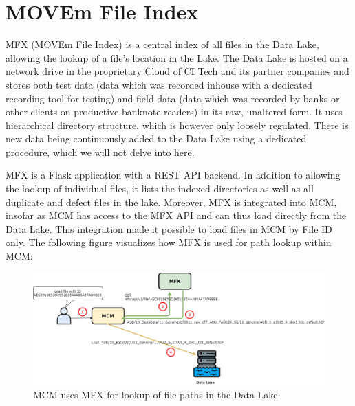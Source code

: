 \section{MOVEm File Index}
MFX (MOVEm File Index) is a central index of all files in the Data Lake, allowing the lookup of a file's location in the Lake. The Data Lake is hosted on a network drive in the proprietary Cloud of CI Tech and its partner companies and stores both test data (data which was recorded inhouse with a dedicated recording tool for testing) and field data (data which was recorded by banks or other clients on productive banknote readers) in its raw, unaltered form. It uses hierarchical directory structure, which is however only loosely regulated. There is new data being continuously added to the Data Lake using a dedicated procedure, which we will not delve into here.\par MFX is a Flask application with a REST API backend. In addition to allowing the lookup of individual files, it lists the indexed directories as well as all duplicate and defect files in the lake. Moreover, MFX is integrated into MCM, insofar as MCM has access to the MFX API and can thus load directly from the Data Lake. This integration made it possible to load files in MCM by File ID only.  The following figure visualizes how MFX is used for path lookup within MCM:
\begin{figure}[ht!]
\includegraphics[width=1.0\textwidth]{images/mfx_usage.png}
  \caption{MCM uses MFX for lookup of file paths in the Data Lake}\label{fig:mfx_usage}
\end{figure}



